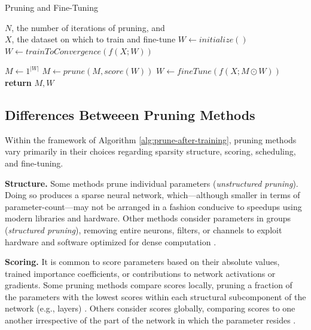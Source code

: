 \begin{algorithm}[h]
\caption{Pruning and Fine-Tuning}
\label{alg:prune-after-training}
\begin{algorithmic}[1]
\REQUIRE $N$, the number of iterations of pruning, and \\ \hspace{1.5em}$X$, the dataset on which to train and fine-tune
    \STATE $W \gets initialize()$
    \STATE $W \gets trainToConvergence(f(X; W))$

    \STATE $M \gets 1^{|W|}$
        \STATE $M \gets prune(M, score(W))$%
        \STATE $W \gets fineTune(f(X; M \odot W))$%
    \ENDFOR
    \STATE \textbf{return} $M, W$
\end{algorithmic}
\end{algorithm}

\subsection{Differences Betweeen Pruning Methods}

Within the framework of Algorithm \ref{alg:prune-after-training}, pruning methods vary primarily in their choices regarding sparsity structure, scoring, scheduling, and fine-tuning.

\textbf{Structure.} Some methods prune individual parameters (\emph{unstructured pruning}). Doing so produces a sparse neural network, which---although smaller in terms of parameter-count---may not be arranged in a fashion conducive to speedups using modern libraries and hardware.
Other methods consider parameters in groups (\emph{structured pruning}), removing entire neurons, filters, or channels to exploit hardware and software optimized for dense computation \cite{pruning-filters, channel-lasso-lstsq}.

\textbf{Scoring.}
It is common to score parameters based on their absolute values, trained importance coefficients, or contributions to network activations or gradients. %
Some pruning methods compare scores locally, pruning a fraction of the parameters with the lowest scores within each structural subcomponent of the network (e.g., layers) \cite{learning-both}.
Others consider scores globally, comparing scores to one another irrespective of the part of the network in which the parameter resides \cite{snip, lottery-ticket}.


